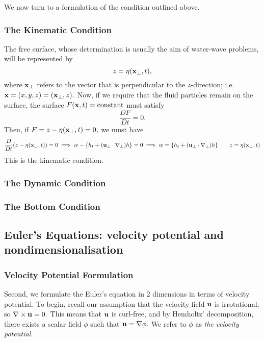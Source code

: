 \documentclass[10pt,reqno,oneside,a4paper]{article}
\begin{document}
We now turn to a formulation of the condition outlined above.

\subsubsection*{The Kinematic Condition}
The free surface, whose determination is usually the aim of water-wave problems, will be represented by 
\[ 
z = \eta({\bf x}_{\perp}, t),
\]
where ${\bf x}_{\perp}$ refers to the vector that is perpendicular to the $z$-direction; i.e. ${\bf x} = (x,y,z)=({\bf x}_{\perp}, z).$ Now, if we require that the fluid particles remain on the surface, the surface $F({\bf x}, t) = {\rm constant}$ must satisfy 
\[ 
\frac{DF}{Dt} = 0.
\]
Then, if $F = z -  \eta({\bf x}_{\perp}, t) = 0,$ we must have 
\[ 
\frac{D}{Dt}(z -  \eta({\bf x}_{\perp}, t)) = 0 \implies w - \{ h_t + ({\bf u}_{\perp}\cdot \nabla_{\perp})h\} = 0 \implies w = \{ h_t + ({\bf u}_{\perp}\cdot \nabla_{\perp})h\} \qquad z = \eta({\bf x}_{\perp}, t)
\]
This is the kinematic condition.
\subsubsection*{The Dynamic Condition}

\subsubsection*{The Bottom Condition}


\subsection{Euler's Equations: velocity potential and nondimensionalisation}

\subsubsection{Velocity Potential Formulation}
Second, we formulate the Euler's equation in 2 dimensions in terms of velocity potential. To begin, recall our assumption that the velocity field ${\bf u}$ is irrotational, so $\nabla \times {\bf u} = 0.$ This means that ${\bf u}$ is curl-free, and by Hemholtz' decomposition, there exists a scalar field $\phi$ such that ${\bf u} = \nabla \phi.$ We refer to $\phi$ as \emph{the velocity potential}. 
\end{document}
